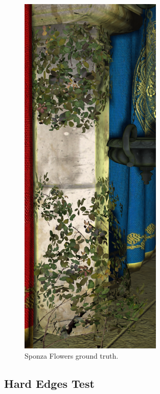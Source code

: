 \documentclass{cslthse-msc}
\begin{document}
\begin{figure}[H]
	\centering
	\includegraphics[scale=0.2]{images/results/sponza_flowers_sobel_ground_truth.png}
	\caption{Sponza Flowers ground truth.}\label{fig:sponza_flowers_truth}
\end{figure}

\subsection{Hard Edges Test}
\end{document}
